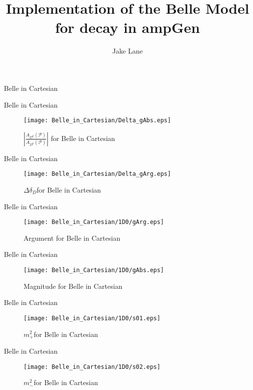 \documentclass{beamer}
\author{Jake Lane}
\title{Implementation of the Belle Model for \diffDtokspipi decay in ampGen}
\newcommand{\strphdiff}{\ensuremath{\Delta \delta_D}}
\newcommand{\MP}{\ensuremath{m^2_+}}
\newcommand{\MM}{\ensuremath{m^2_-}}
\newcommand{\Dz}{\ensuremath{D^0} }
\newcommand{\genAmp}[2]{\ensuremath{A_{#1}^{\text{#2}}\left(\mathcal{P} \right)}}
\begin{document}
\begin{frame}{}
    \maketitle
\end{frame}
\begin{frame}{Belle in Cartesian}
\begin{tiny}
\end{tiny}
\end{frame}
\begin{frame}{Belle in Cartesian}
\begin{figure}
\texttt{[image: Belle\_in\_Cartesian/Delta\_gAbs.eps]}
\caption{$\left|\frac{\genAmp{\Dz}{}}{\genAmp{\Dz}{}}\right|$ for Belle in Cartesian}
\end{figure}
\end{frame}
\begin{frame}{Belle in Cartesian}
\begin{figure}
\texttt{[image: Belle\_in\_Cartesian/Delta\_gArg.eps]}
\caption{\strphdiff for Belle in Cartesian}
\end{figure}
\end{frame}
\begin{frame}{Belle in Cartesian}
\begin{figure}
\texttt{[image: Belle\_in\_Cartesian/1D0/gArg.eps]}
\caption{Argument for Belle in Cartesian}
\end{figure}
\end{frame}
\begin{frame}{Belle in Cartesian}
\begin{figure}
\texttt{[image: Belle\_in\_Cartesian/1D0/gAbs.eps]}
\caption{Magnitude for Belle in Cartesian}
\end{figure}
\end{frame}
\begin{frame}{Belle in Cartesian}
\begin{figure}
\texttt{[image: Belle\_in\_Cartesian/1D0/s01.eps]}
\caption{\MP for Belle in Cartesian}
\end{figure}
\end{frame}
\begin{frame}{Belle in Cartesian}
\begin{figure}
\texttt{[image: Belle\_in\_Cartesian/1D0/s02.eps]}
\caption{\MM for Belle in Cartesian}
\end{figure}
\end{frame}
\end{document}
